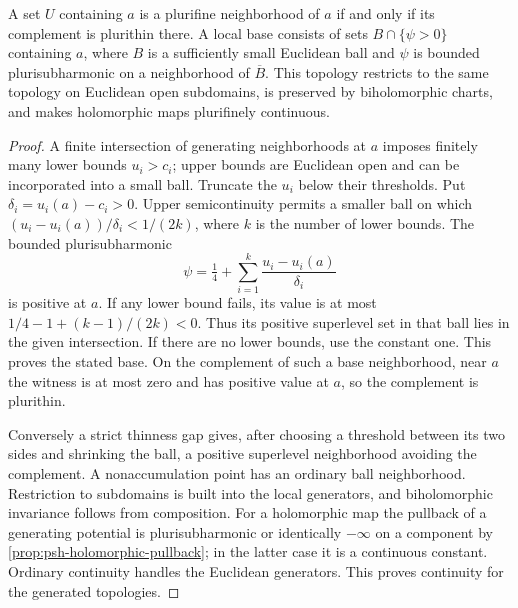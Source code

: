 \begin{proposition}\label{prop:plurifine-base}
A set $U$ containing $a$ is a plurifine neighborhood of $a$ if and only if its complement is plurithin there. A local base consists of sets $B\cap\{\psi>0\}$ containing $a$, where $B$ is a sufficiently small Euclidean ball and $\psi$ is bounded plurisubharmonic on a neighborhood of $\overline B$. This topology restricts to the same topology on Euclidean open subdomains, is preserved by biholomorphic charts, and makes holomorphic maps plurifinely continuous.
\end{proposition}
\begin{proof}
A finite intersection of generating neighborhoods at $a$ imposes finitely many lower bounds $u_i>c_i$; upper bounds are Euclidean open and can be incorporated into a small ball. Truncate the $u_i$ below their thresholds. Put $\delta_i=u_i(a)-c_i>0$. Upper semicontinuity permits a smaller ball on which $(u_i-u_i(a))/\delta_i<1/(2k)$, where $k$ is the number of lower bounds. The bounded plurisubharmonic
\[
 \psi=\tfrac14+\sum_{i=1}^k\frac{u_i-u_i(a)}{\delta_i}
\]
is positive at $a$. If any lower bound fails, its value is at most $1/4-1+(k-1)/(2k)<0$. Thus its positive superlevel set in that ball lies in the given intersection. If there are no lower bounds, use the constant one. This proves the stated base. On the complement of such a base neighborhood, near $a$ the witness is at most zero and has positive value at $a$, so the complement is plurithin.

Conversely a strict thinness gap gives, after choosing a threshold between its two sides and shrinking the ball, a positive superlevel neighborhood avoiding the complement. A nonaccumulation point has an ordinary ball neighborhood. Restriction to subdomains is built into the local generators, and biholomorphic invariance follows from composition. For a holomorphic map the pullback of a generating potential is plurisubharmonic or identically $-\infty$ on a component by \cref{prop:psh-holomorphic-pullback}; in the latter case it is a continuous constant. Ordinary continuity handles the Euclidean generators. This proves continuity for the generated topologies.
\end{proof}

